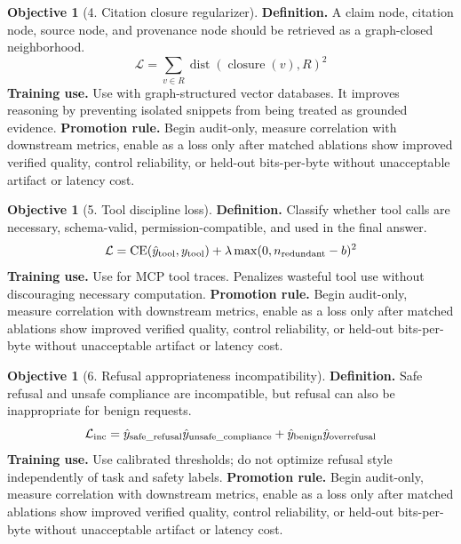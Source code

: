 \documentclass[11pt]{article}
\theoremstyle{definition}
\newtheorem{objective}[theorem]{Objective}
\theoremstyle{remark}
\newcommand{\CE}{\operatorname{CE}}
\newcommand{\loss}{\mathcal{L}}
\numberwithin{equation}{section}
\begin{document}
\begin{objective}[4. Citation closure regularizer]
\textbf{Definition.} A claim node, citation node, source node, and provenance node should be retrieved as a graph-closed neighborhood.
\begin{equation}
    \loss=\sum_{v\in R}\operatorname{dist}(\operatorname{closure}(v),R)^2
\end{equation}
\textbf{Training use.} Use with graph-structured vector databases. It improves reasoning by preventing isolated snippets from being treated as grounded evidence.
\textbf{Promotion rule.} Begin audit-only, measure correlation with downstream metrics, enable as a loss only after matched ablations show improved verified quality, control reliability, or held-out bits-per-byte without unacceptable artifact or latency cost.
\end{objective}


\begin{objective}[5. Tool discipline loss]
\textbf{Definition.} Classify whether tool calls are necessary, schema-valid, permission-compatible, and used in the final answer.
\begin{equation}
    \loss=\CE(\hat y_{\rm tool},y_{\rm tool})+\lambda\max(0, n_{\rm redundant}-b)^2
\end{equation}
\textbf{Training use.} Use for MCP tool traces. Penalizes wasteful tool use without discouraging necessary computation.
\textbf{Promotion rule.} Begin audit-only, measure correlation with downstream metrics, enable as a loss only after matched ablations show improved verified quality, control reliability, or held-out bits-per-byte without unacceptable artifact or latency cost.
\end{objective}


\begin{objective}[6. Refusal appropriateness incompatibility]
\textbf{Definition.} Safe refusal and unsafe compliance are incompatible, but refusal can also be inappropriate for benign requests.
\begin{equation}
    \loss_{\rm inc}=\hat y_{\rm safe\_refusal}\hat y_{\rm unsafe\_compliance}+\hat y_{\rm benign}\hat y_{\rm overrefusal}
\end{equation}
\textbf{Training use.} Use calibrated thresholds; do not optimize refusal style independently of task and safety labels.
\textbf{Promotion rule.} Begin audit-only, measure correlation with downstream metrics, enable as a loss only after matched ablations show improved verified quality, control reliability, or held-out bits-per-byte without unacceptable artifact or latency cost.
\end{objective}
\end{document}
